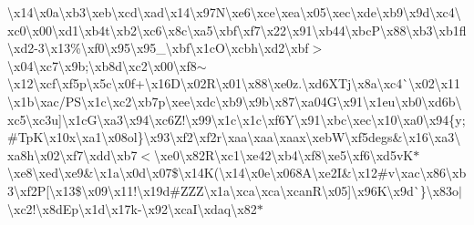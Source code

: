 \begin{DoxyCompactItemize}
\textbackslash{}x14\textbackslash{}x0a\textbackslash{}xb3\textbackslash{}xeb\textbackslash{}xcd\textbackslash{}xad\textbackslash{}x14\textbackslash{}x97\+N\textbackslash{}xe6\textbackslash{}xce\textbackslash{}xea\textbackslash{}x05\textbackslash{}xec\textbackslash{}xde\textbackslash{}xb9\textbackslash{}x9d\textbackslash{}xc4\textbackslash{}xc0\textbackslash{}x00\textbackslash{}xd1\textbackslash{}xb4t\textbackslash{}xb2\textbackslash{}xc6\textbackslash{}x8c\textbackslash{}xa5\textbackslash{}xbf\textbackslash{}xf7\textbackslash{}x22\textbackslash{}x91\textbackslash{}xb44\textbackslash{}xbc\+P\textbackslash{}x88\textbackslash{}xb3\textbackslash{}xb1fl\textbackslash{}xd2\textquotesingle{}-\/3\textbackslash{}x13\%\textbackslash{}xf0\textbackslash{}x95\textbackslash{}x95\+\_\+\textbackslash{}xbf\textbackslash{}x1c\+O\textbackslash{}xcbh\textbackslash{}xd2\textbackslash{}xbf$>$\textbackslash{}x04\textbackslash{}xc7\textbackslash{}x9b;\textbackslash{}xb8d\textbackslash{}xc2\textbackslash{}x00\textbackslash{}xf8$\sim$\textbackslash{}x12\textbackslash{}xcf\textbackslash{}xf5p\textbackslash{}x5c\textbackslash{}x0f+\textbackslash{}x16\+D\textbackslash{}x02\+R\textbackslash{}x01\textbackslash{}x88\textbackslash{}xe0z.\textbackslash{}xd6\+X\+Tj\textbackslash{}x8a\textbackslash{}xc4\`{}\textbackslash{}x02\textbackslash{}x11\textbackslash{}x1b\textbackslash{}xac/\+P\+S\textbackslash{}x1c\textbackslash{}xc2\textbackslash{}xb7p\textbackslash{}xee\textbackslash{}xdc\textbackslash{}xb9\textbackslash{}x9b\textbackslash{}x87\textbackslash{}xa04\+G\textbackslash{}x91\textbackslash{}x1eu\textbackslash{}xb0\textbackslash{}xd6b\textbackslash{}xc5\textbackslash{}xc3u\mbox{]}\textbackslash{}x1c\+G\textbackslash{}xa3\textbackslash{}x94\textbackslash{}xc6\+Z!\textbackslash{}x99\textbackslash{}x1c\textbackslash{}x1c\textbackslash{}xf6\+Y\textbackslash{}x91\textbackslash{}xbc\textbackslash{}xec\textbackslash{}x10\textbackslash{}xa0\textbackslash{}x94\{y;\#\+Tp\+K\textbackslash{}x10x\textbackslash{}xa1\textbackslash{}x08ol\}\textbackslash{}x93\textbackslash{}xf2\textbackslash{}xf2r\textbackslash{}xaa\textbackslash{}xaa\textbackslash{}xaax\textbackslash{}xeb\+W\textbackslash{}xf5degs\&\textbackslash{}x16\textbackslash{}xa3\textbackslash{}xa8h\textbackslash{}x02\textbackslash{}xf7\textbackslash{}xdd\textbackslash{}xb7$<$\textbackslash{}xe0\textbackslash{}x82\+R\textbackslash{}xc1\textbackslash{}xe42\textbackslash{}xb4\textbackslash{}xf8\textbackslash{}xe5\textbackslash{}xf6\textbackslash{}xd5v\+K$\ast$\textbackslash{}xe8\textbackslash{}xed\textbackslash{}xe9\&\textbackslash{}x1a\textbackslash{}x0d\textbackslash{}x07\$\textbackslash{}x14\+K(\textbackslash{}x14\textbackslash{}x0e\textbackslash{}x068\+A\textbackslash{}xe2\+I\&\textbackslash{}x12\#v\textbackslash{}xac\textbackslash{}x86\textbackslash{}xb3\textbackslash{}xf2\+P\mbox{[}\textbackslash{}x13\$\textbackslash{}x09\textbackslash{}x11!\textbackslash{}x19d\#\+Z\+Z\+Z\textbackslash{}x1a\textbackslash{}xca\textbackslash{}xca\textbackslash{}xcan\+R\textbackslash{}x05\mbox{]}\textbackslash{}x96\+K\textbackslash{}x9d\`{}\}\textbackslash{}x83o$\vert$\textbackslash{}xc2!\textbackslash{}x8d\+Ep\textbackslash{}x1d\textbackslash{}x17k-\/\textbackslash{}x92\textbackslash{}xca\+I\textbackslash{}xdaq\textbackslash{}x82$\ast$ 
\end{DoxyCompactItemize}
